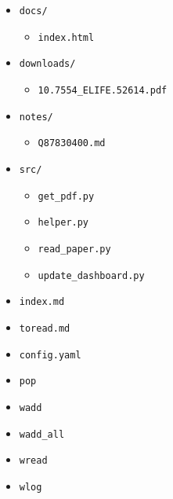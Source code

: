 \begin{itemize}
\tightlist
\item
  \texttt{docs/}

  \begin{itemize}
  \tightlist
  \item
    \texttt{index.html}
  \end{itemize}
\item
  \texttt{downloads/}

  \begin{itemize}
  \tightlist
  \item
    \texttt{10.7554\_ELIFE.52614.pdf}
  \end{itemize}
\item
  \texttt{notes/}

  \begin{itemize}
  \tightlist
  \item
    \texttt{Q87830400.md}
  \end{itemize}
\item
  \texttt{src/}

  \begin{itemize}
  \tightlist
  \item
    \texttt{get\_pdf.py}
  \item
    \texttt{helper.py}
  \item
    \texttt{read\_paper.py}
  \item
    \texttt{update\_dashboard.py}
  \end{itemize}
\item
  \texttt{index.md}
\item
  \texttt{toread.md}
\item
  \texttt{config.yaml}
\item
  \texttt{pop}
\item
  \texttt{wadd}
\item
  \texttt{wadd\_all}
\item
  \texttt{wread}
\item
  \texttt{wlog}
\end{itemize}

